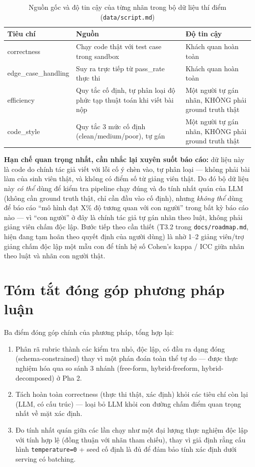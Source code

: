 \documentclass[a4paper,12pt]{report}
\begin{document}
\begin{table}[h]
\centering
\begin{tabular}{lll}
\toprule
\textbf{Tiêu chí} & \textbf{Nguồn} & \textbf{Độ tin cậy} \\
\midrule
correctness & Chạy code thật với test case trong sandbox & Khách quan hoàn toàn \\
edge\_case\_handling & Suy ra trực tiếp từ pass\_rate thực thi & Khách quan hoàn toàn \\
efficiency & Quy tắc cố định, tự phân loại độ phức tạp thuật toán
  khi viết bài nộp & Một người tự gán nhãn, KHÔNG phải ground truth thật \\
code\_style & Quy tắc 3 mức cố định (clean/medium/poor), tự gán & Một người tự gán nhãn,
  KHÔNG phải ground truth thật \\
\bottomrule
\end{tabular}
\caption{Nguồn gốc và độ tin cậy của từng nhãn trong bộ dữ liệu thí điểm
(\texttt{data/script.md})}
\end{table}

\textbf{Hạn chế quan trọng nhất, cần nhắc lại xuyên suốt báo cáo:} dữ liệu
này là code do chính tác giả viết với lỗi cố ý chèn vào, tự phân loại —
không phải bài làm của sinh viên thật, và không có điểm số từ giảng viên
thật. Do đó bộ dữ liệu này \emph{có thể} dùng để kiểm tra pipeline chạy
đúng và đo tính nhất quán của LLM (không cần ground truth thật, chỉ cần đầu
vào cố định), nhưng \emph{không thể} dùng để báo cáo ``mô hình đạt X\% độ
tương quan với con người'' trong bất kỳ báo cáo nào — vì ``con người'' ở đây là chính
tác giả tự gán nhãn theo luật, không phải giảng viên chấm độc lập. Bước
tiếp theo cần thiết (T3.2 trong \texttt{docs/roadmap.md}, hiện đang tạm
hoãn theo quyết định của người dùng) là nhờ 1--2 giảng viên/trợ giảng chấm
độc lập một mẫu con để tính hệ số Cohen's kappa / ICC giữa nhãn theo luật
và nhãn con người thật.

\section{Tóm tắt đóng góp phương pháp luận}

Ba điểm đóng góp chính của phương pháp, tổng hợp lại:

\begin{enumerate}
  \item Phân rã rubric thành các kiểm tra nhỏ, độc lập, có đầu ra dạng
    đóng (schema-constrained) thay vì một phán đoán toàn thể tự do —
    được thực nghiệm hóa qua so sánh 3 nhánh (free-form, hybrid-freeform,
    hybrid-decomposed) ở Pha 2.
  \item Tách hoàn toàn correctness (thực thi thật, xác định) khỏi các tiêu
    chí còn lại (LLM, có cấu trúc) — loại bỏ LLM khỏi con đường chấm điểm
    quan trọng nhất về mặt xác định.
  \item Đo tính nhất quán giữa các lần chạy như một đại lượng thực nghiệm
    độc lập với tính hợp lệ (đồng thuận với nhãn tham chiếu), thay vì giả
    định rằng cấu hình \texttt{temperature=0} + seed cố định là đủ để đảm
    bảo tính xác định dưới serving có batching.
\end{enumerate}
\end{document}

